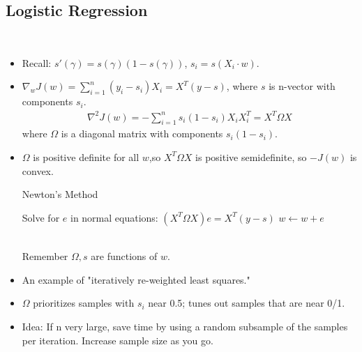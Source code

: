 \documentclass[10pt]{article}
\begin{document}
		\subsection*{Logistic Regression}
			\
			\begin{itemize}
				\item Recall: $s'(\gamma) = s(\gamma)(1 - s(\gamma))$, $s_{i} = s(X_{i}\cdot w)$.
				\item $\nabla_{w}J(w) = \sum_{i=1}^{n}(y_{i} - s_{i})X_{i} = X^{T}(y - s)$, where $s$ is n-vector with components $s_{i}$.
					\begin{align*}
						\nabla^{2}J(w) = -\sum_{i=1}^{n}s_{i}(1 - s_{i})X_{i}X_{i}^{T} = X^{T}\Omega X
					\end{align*}
				where $\Omega$ is a diagonal matrix with components $s_{i}(1 - s_{i})$.
				\item $\Omega$ is positive definite for all $w$,so $X^{T}\Omega X$ is positive semidefinite, so $-J(w)$ is convex.
					\begin{algorithm*}
					\caption{Newton's Method}
					\begin{algorithmic}
						\State Solve for $e$ in normal equations: $(X^{T}\Omega X)e = X^{T}(y - s)$
						\State $w \leftarrow w + e$
						\EndWhile
					\end{algorithmic}
				\end{algorithm*}\\
				Remember $\Omega, s$ are functions of $w$.
				\item An example of "iteratively re-weighted least squares."
				\item $\Omega$ prioritizes samples with $s_{i}$ near 0.5; tunes out samples that are near 0/1.
				\item Idea: If n very large, save time by using a random subsample of the samples per iteration. Increase sample size as you go.
			\end{itemize}
			
\end{document}
